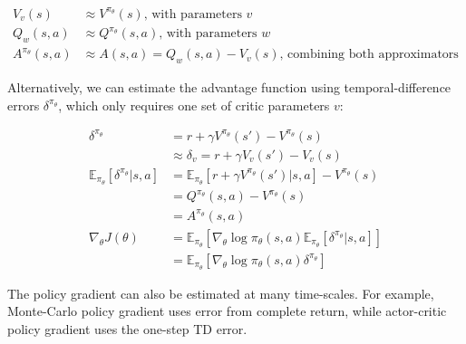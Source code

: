 \begin{align*}
    V_v(s)              & \approx V^{\pi_\theta}(s) \text{, with parameters } v                    \\
    Q_w(s,a)            & \approx Q^{\pi_\theta}(s,a) \text{, with parameters } w                  \\
    A^{\pi_\theta}(s,a) & \approx A(s,a) = Q_w(s,a) - V_v(s) \text{, combining both approximators}
\end{align*}

\noindent Alternatively, we can estimate the advantage function using temporal-difference
errors $\delta^{\pi_\theta}$, which only requires one set of critic parameters $v$:

\begin{align*}
    \delta^{\pi_\theta}                               & = r + \gamma V^{\pi_\theta}(s') - V^{\pi_\theta}(s)                                                               \\
                                                      & \approx \delta_v = r + \gamma V_v(s') - V_v(s)                                                                    \\
    \mathbb{E}_{\pi_\theta}[\delta^{\pi_\theta}|s, a] & = \mathbb{E}_{\pi_\theta}[r + \gamma V^{\pi_\theta}(s')|s, a] - V^{\pi_\theta}(s)                                 \\
                                                      & = Q^{\pi_\theta}(s, a) - V^{\pi_\theta}(s)                                                                        \\
                                                      & = A^{\pi_\theta}(s, a)                                                                                            \\
    \nabla_\theta J(\theta)                           & = \mathbb{E}_{\pi_\theta}[\nabla_\theta \log \pi_\theta(s, a) \mathbb{E}_{\pi_\theta}[\delta^{\pi_\theta}|s, a] ] \\
                                                      & = \mathbb{E}_{\pi_\theta}[\nabla_\theta \log \pi_\theta(s, a) \delta^{\pi_\theta}]
\end{align*}

\noindent The policy gradient can also be estimated at many time-scales. For
example, Monte-Carlo policy gradient uses error from complete return, while
actor-critic policy gradient uses the one-step TD error.

